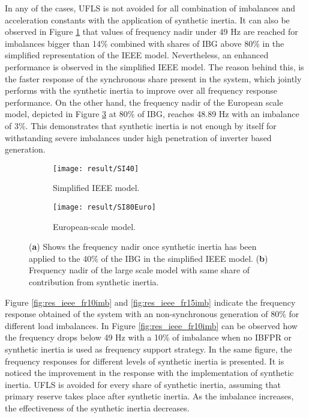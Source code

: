 In any of the cases, UFLS is not avoided for all combination of imbalances and acceleration constants with the application of synthetic inertia. It can also be observed in Figure \ref{fig:res_nadirieee_si} that values of frequency nadir under 49 Hz are reached for imbalances bigger than 14\% combined with shares of IBG above 80\% in the simplified representation of the IEEE model. Nevertheless, an enhanced performance is observed in the simplified IEEE model. The reason behind this, is the faster response of the synchronous share present in the system, which jointly performs with the synthetic inertia to improve over all frequency response performance. On the other hand, the frequency nadir of the European scale model, depicted in Figure \ref{fig:res_nadireuro_si} at 80\% of IBG, reaches 48.89 Hz with an imbalance of 3\%. This demonstrates that synthetic inertia is not enough by itself for withstanding severe imbalances under high penetration of inverter based generation.\\
\begin{figure}[h]
	\centering
	\begin{subfigure}[h]{0.49\textwidth}
		\centering
		\texttt{[image: result/SI40]}
		\caption{Simplified IEEE model.}
		\label{fig:res_nadirieee_si}
	\end{subfigure}
	\hfill
	\begin{subfigure}[h]{0.49\textwidth}
		\centering
		\texttt{[image: result/SI80Euro]}
		\caption{European-scale model.}
		\label{fig:res_nadireuro_si}
	\end{subfigure}
	
	
	\caption{(\textbf{a}) Shows the frequency nadir once synthetic inertia has been applied to the 40\% of the IBG in the simplified IEEE model. (\textbf{b}) Frequency nadir of the large scale model with same share of contribution from synthetic inertia.}
\end{figure}


Figure \ref{fig:res_ieee_fr10imb} and \ref{fig:res_ieee_fr15imb} indicate the frequency response obtained of the system with an non-synchronous generation of 80\% for different load imbalances.  In Figure \ref{fig:res_ieee_fr10imb} can be observed how the frequency drops below 49 Hz with a 10\% of imbalance when no IBFPR or synthetic inertia is used as frequency support strategy. In the same figure, the frequency responses for different levels of synthetic inertia is presented. It is noticed the improvement in the response with the implementation of synthetic inertia. UFLS is avoided for every share of synthetic inertia, assuming that primary reserve takes place after synthetic inertia. As the imbalance increases, the effectiveness of the synthetic inertia decreases. 

